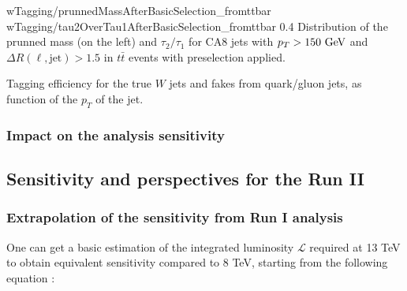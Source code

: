                              {wTagging/prunnedMassAfterBasicSelection_fromttbar}
                             {wTagging/tau2OverTau1AfterBasicSelection_fromttbar}
                             {0.4}
                             {Distribution of the prunned mass (on the left) and $\tau_2 
                             / \tau_1$ for CA8 jets with $p_T > 150~\text{GeV}$ and 
                             $\Delta R(\ell,\text{jet}) > 1.5$ in $t\bar{t}$ events
                             with preselection applied.}

                         {Tagging efficiency for the true $W$ jets and fakes from quark/gluon
                         jets, as function of the $p_T$ of the jet.}

            \subsubsection{Impact on the analysis sensitivity}
           
        
        \subsection{Sensitivity and perspectives for the Run II}
        
        \loremipsum

            \subsubsection{Extrapolation of the sensitivity from Run I analysis}

        One can get a basic estimation of the integrated luminosity $\mathcal{L}$ required 
        at 13 TeV to obtain equivalent sensitivity compared to 8 TeV, starting from the 
        following equation : 


